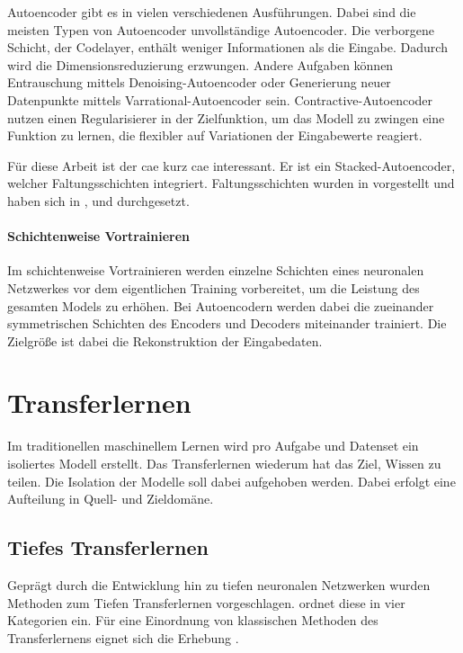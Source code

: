 	Autoencoder gibt es in vielen verschiedenen Ausführungen. Dabei sind die meisten Typen von Autoencoder unvollständige Autoencoder. Die verborgene Schicht, der Codelayer, enthält weniger Informationen als die Eingabe. Dadurch wird die Dimensionsreduzierung erzwungen. Andere Aufgaben können Entrauschung mittels Denoising-Autoencoder \cite{Vincent.2008} oder Generierung neuer Datenpunkte mittels Varrational-Autoencoder \cite{Kingma.2019} sein. Contractive-Autoencoder \cite{Rifai.2011} nutzen einen Regularisierer in der Zielfunktion, um das Modell zu zwingen eine Funktion zu lernen, die flexibler auf Variationen der Eingabewerte reagiert.   	

	Für diese Arbeit ist der \acl{cae} \cite{Masci.2011} kurz \ac{cae} interessant. Er ist ein Stacked-Autoencoder, welcher Faltungsschichten integriert. Faltungsschichten wurden in \cite{LeCun.1999} vorgestellt und haben sich in \cite{Krizhevsky.2012}, \cite{ChristianSzegedy.2014} und \cite{LeCun.2015} durchgesetzt. 
		
	\paragraph{Schichtenweise Vortrainieren} Im schichtenweise Vortrainieren \cite{Bengio.2007} werden einzelne Schichten eines neuronalen Netzwerkes vor dem eigentlichen Training vorbereitet, um die Leistung des gesamten Models zu erhöhen. Bei Autoencodern werden dabei die zueinander symmetrischen Schichten des Encoders und Decoders miteinander trainiert. Die Zielgröße ist dabei die Rekonstruktion der Eingabedaten.    

	\section{ Transferlernen}
	\label{sec:Transferlernen}
	Im traditionellen maschinellem Lernen wird pro Aufgabe und Datenset ein isoliertes Modell erstellt. Das Transferlernen wiederum hat das Ziel, Wissen zu teilen. Die Isolation der Modelle soll dabei aufgehoben werden. Dabei erfolgt eine Aufteilung in Quell- und Zieldomäne.
	
		\subsection{Tiefes Transferlernen}
		Geprägt durch die Entwicklung hin zu tiefen neuronalen Netzwerken wurden Methoden zum Tiefen Transferlernen vorgeschlagen. \cite{Tan.2018} ordnet diese in vier Kategorien ein. Für eine Einordnung von klassischen Methoden des Transferlernens eignet sich die Erhebung \cite{FuzhenZhuang.2019}.
		 
